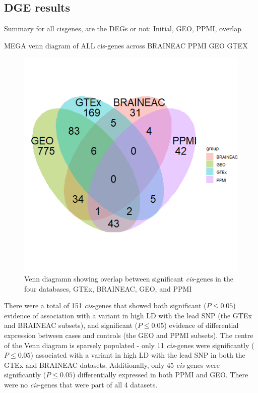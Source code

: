 \documentclass{article}
\begin{document}
\subsection{DGE results}

Summary for all cisgenes, are the DEGs or not:
Initial, GEO, PPMI, overlap

MEGA venn diagram of ALL cis-genes across BRAINEAC PPMI GEO GTEX

\newpage
\begin{figure}[h]
    \centering
    \includegraphics[width=1\linewidth]{Thesis/thesis images/vennsigcisgenes.png}
    \caption{Venn diagramn showing overlap between significant \textit{cis}-genes in the four databases, GTEx, BRAINEAC, GEO, and PPMI}
    \label{fig:enter-label}
\end{figure}

There were a total of 151 \textit{cis}-genes that showed both significant ($P \leq 0.05$) evidence of association with a variant in high LD with the lead SNP (the GTEx and BRAINEAC subsets), and significant ($P \leq 0.05$) evidence of differential expression between cases and controls (the GEO and PPMI subsets). The centre of the Venn diagram is sparsely populated - only 11 \textit{cis}-genes were significantly ($P \leq 0.05$) associated with a variant in high LD with the lead SNP in both the GTEx and BRAINEAC datasets. Additionally, only 45 \textit{cis}-genes were significantly ($P \leq 0.05$) differentially expressed in both PPMI and GEO. There were no \textit{cis}-genes that were part of all 4 datasets. 
\end{document}

